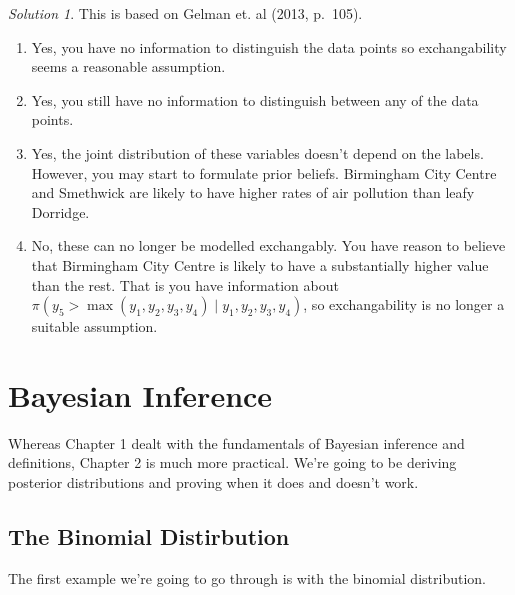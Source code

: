 \documentclass[
]{book}
\providecommand{\tightlist}{%
  \setlength{\itemsep}{0pt}\setlength{\parskip}{0pt}}
\theoremstyle{definition}
\theoremstyle{definition}
\theoremstyle{definition}
\theoremstyle{definition}
\theoremstyle{remark}
\newtheorem*{solution}{Solution}
\begin{document}
\begin{solution}

This is based on Gelman et. al (2013, p.~105).

\begin{enumerate}
\def\labelenumi{\arabic{enumi}.}
\tightlist
\item
  Yes, you have no information to distinguish the data points so exchangability seems a reasonable assumption.
\item
  Yes, you still have no information to distinguish between any of the data points.
\item
  Yes, the joint distribution of these variables doesn't depend on the labels. However, you may start to formulate prior beliefs. Birmingham City Centre and Smethwick are likely to have higher rates of air pollution than leafy Dorridge.
\item
  No, these can no longer be modelled exchangably. You have reason to believe that Birmingham City Centre is likely to have a substantially higher value than the rest. That is you have information about \(\pi(y_5 > \max(y_1, y_2, y_3, y_4) \mid y_1, y_2, y_3, y_4)\), so exchangability is no longer a suitable assumption.
\end{enumerate}

\end{solution}

\hypertarget{bayesian-inference}{%
\chapter{Bayesian Inference}\label{bayesian-inference}}

Whereas Chapter 1 dealt with the fundamentals of Bayesian inference and definitions, Chapter 2 is much more practical. We're going to be deriving posterior distributions and proving when it does and doesn't work.

\hypertarget{the-binomial-distirbution}{%
\section{The Binomial Distirbution}\label{the-binomial-distirbution}}

The first example we're going to go through is with the binomial distribution.
\end{document}
